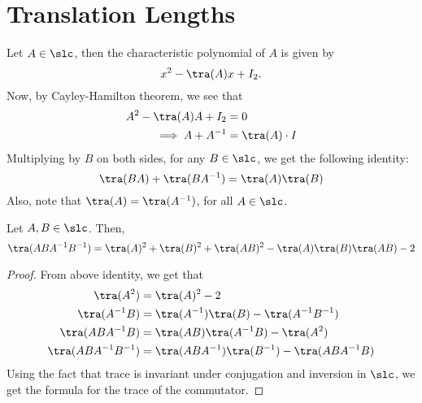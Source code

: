 
\chapter{Translation Lengths}

Let $A \in \slc$, then the characteristic polynomial of $A$ is given by $$x^2- \tra(A)x+ I_2.$$ 
Now, by Cayley-Hamilton theorem, we see that
\begin{align*}
	A^2 - \tra(A)A+ I_2&= 0 \\
	\implies A + A^{-1}&= \tra(A) \cdot I
\end{align*} 
 Multiplying by $B$ on both sides, for any $B \in \slc$, we get the following identity:
\[\tra(BA)+\tra(BA^{-1}) = \tra(A)\tra(B) \]
Also, note that $\tra(A) = \tra(A^{-1})$, for all $A \in \slc$.

 
\begin{prop}
	\label{prop:traceformula}
	Let $A,B \in \slc$. Then,
	$$\tra(ABA^{-1}B^{-1}) = \tra(A)^2+\tra(B)^2+\tra(AB)^2 - \tra(A) \tra(B) \tra(AB) -2$$
\end{prop}
\begin{proof}
	From above identity, we get that
	\begin{align*}
		\tra(A^2)&= \tra(A)^2 - 2 \\
		\tra(A^{-1}B)&= \tra(A^{-1})\tra(B) - \tra(A^{-1}B^{-1}) \\
		\tra(ABA^{-1}B) &= \tra(AB) \tra(A^{-1}B) - \tra(A^2)\\
		\tra(ABA^{-1}B^{-1}) &= \tra(ABA^{-1}) \tra(B^{-1}) - \tra(ABA^{-1}B)
	\end{align*}
	Using the fact that trace is invariant under conjugation and inversion in $\slc$, we get the formula for the trace of the commutator.
\end{proof}

